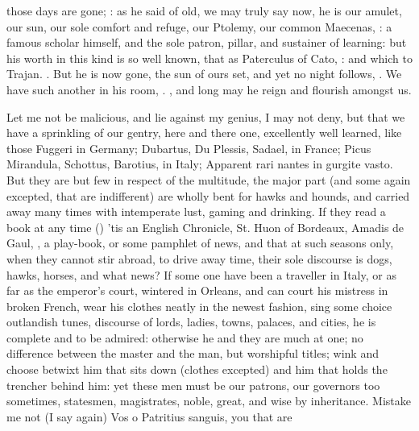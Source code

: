 {{those days are gone; : as he said of old, we may truly say now, he is
our amulet, our sun, our sole comfort and refuge, our Ptolemy, our common
Maecenas, : a famous scholar himself,
and the sole patron, pillar, and sustainer of learning: but his worth
in this kind is so well known, that as Paterculus of Cato, : and which \Pliny{} to Trajan. . But he is now gone, the sun of ours set, and yet no night
follows, . We have such another in
his room, . ,
and long may he reign and flourish amongst us.

Let me not be malicious, and lie against my genius, I may not deny, but
that we have a sprinkling of our gentry, here and there one,
excellently well learned, like those Fuggeri in Germany; Dubartus, Du
Plessis, Sadael, in France; Picus Mirandula, Schottus, Barotius, in
Italy; Apparent rari nantes in gurgite vasto. But they are but few in
respect of the multitude, the major part (and some again excepted, that
are indifferent) are wholly bent for hawks and hounds, and carried away
many times with intemperate lust, gaming and drinking. If they read a
book at any time () 'tis an English Chronicle, St. Huon of Bordeaux, Amadis de
Gaul, \etc{}, a play-book, or some pamphlet of news, and that at such
seasons only, when they cannot stir abroad, to drive away time,
their sole discourse is dogs, hawks, horses, and what news? If
some one have been a traveller in Italy, or as far as the emperor's
court, wintered in Orleans, and can court his mistress in broken
French, wear his clothes neatly in the newest fashion, sing some choice
outlandish tunes, discourse of lords, ladies, towns, palaces, and
cities, he is complete and to be admired: otherwise he and they
are much at one; no difference between the master and the man, but
worshipful titles; wink and choose betwixt him that sits down (clothes
excepted) and him that holds the trencher behind him: yet these men
must be our patrons, our governors too sometimes, statesmen,
magistrates, noble, great, and wise by inheritance.
Mistake me not (I say again) Vos o Patritius sanguis, you that are

}}
